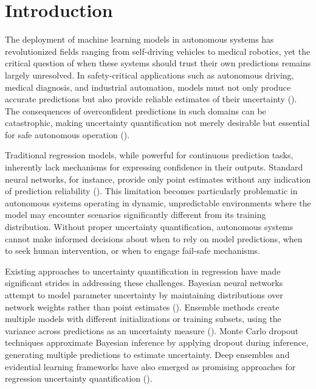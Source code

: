 
\section{Introduction}

The deployment of machine learning models in autonomous systems has revolutionized fields ranging from self-driving vehicles to medical robotics, yet the critical question of when these systems should trust their own predictions remains largely unresolved. In safety-critical applications such as autonomous driving, medical diagnosis, and industrial automation, models must not only produce accurate predictions but also provide reliable estimates of their uncertainty (\cite{malinin2020regression, wibbeke2025evaluating, bigi2024prediction}). The consequences of overconfident predictions in such domains can be catastrophic, making uncertainty quantification not merely desirable but essential for safe autonomous operation (\cite{gawlikowski2021survey}).

Traditional regression models, while powerful for continuous prediction tasks, inherently lack mechanisms for expressing confidence in their outputs. Standard neural networks, for instance, provide only point estimates without any indication of prediction reliability (\cite{gawlikowski2021survey}). This limitation becomes particularly problematic in autonomous systems operating in dynamic, unpredictable environments where the model may encounter scenarios significantly different from its training distribution. Without proper uncertainty quantification, autonomous systems cannot make informed decisions about when to rely on model predictions, when to seek human intervention, or when to engage fail-safe mechanisms.

Existing approaches to uncertainty quantification in regression have made significant strides in addressing these challenges. Bayesian neural networks attempt to model parameter uncertainty by maintaining distributions over network weights rather than point estimates (\cite{dunger2025uncertainties}). Ensemble methods create multiple models with different initializations or training subsets, using the variance across predictions as an uncertainty measure (\cite{dunger2025uncertainties}). Monte Carlo dropout techniques approximate Bayesian inference by applying dropout during inference, generating multiple predictions to estimate uncertainty. Deep ensembles and evidential learning frameworks have also emerged as promising approaches for regression uncertainty quantification (\cite{wibbeke2025evaluating}).

